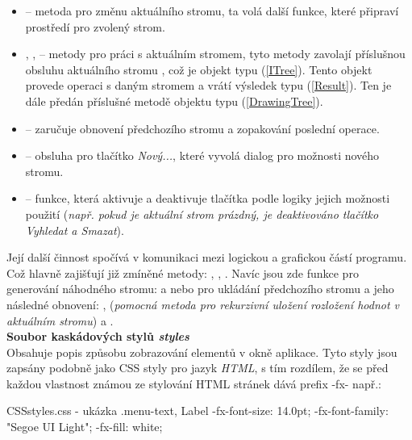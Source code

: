 \documentclass[
  biblatex=false,
  font=serif,
  glossaries=false,
  tables=false,
  theorems=false,
  index
]{kidiplom}
\begin{document}
\begin{itemize}
\item {} -- metoda pro změnu aktuálního stromu, ta volá další funkce, které připraví prostředí pro zvolený strom.

\item {},  ,  \label{zakladniMetody} -- metody pro práci s aktuálním stromem, tyto metody zavolají příslušnou obsluhu aktuálního stromu , což je objekt typu  (\ref{ITree}). Tento objekt provede operaci s daným stromem a vrátí výsledek typu  (\ref{Result}). Ten je dále předán příslušné metodě objektu  typu  (\ref{DrawingTree}).

\item {} -- zaručuje obnovení předchozího stromu a zopakování poslední operace.

\item {} -- obsluha pro tlačítko \textit{Nový...}, které vyvolá dialog pro možnosti nového stromu.

\item {} -- funkce, která aktivuje a deaktivuje tlačítka podle logiky jejich možnosti použití (\textit{např. pokud je aktuální strom prázdný, je deaktivováno tlačítko Vyhledat a Smazat}).
\end{itemize}

\indent Její další činnost spočívá v komunikaci mezi logickou a grafickou částí programu. Což hlavně zajišťují již zmíněné metody: ,  , . Navíc jsou zde funkce pro generování náhodného stromu:  a  nebo pro ukládání předchozího stromu a jeho následné obnovení: ,  (\textit{pomocná metoda pro rekurzivní uložení rozložení hodnot v aktuálním stromu}) a .\\

\noindent \textbf{Soubor kaskádových stylů \textit{styles}}\\
\indent Obsahuje popis způsobu zobrazování elementů v okně aplikace. Tyto styly jsou zapsány podobně jako CSS styly pro jazyk \textit{HTML}, s tím rozdílem, že se před každou vlastnost známou ze stylování HTML stránek dává prefix -fx- např.:
\begin{kicode}{CSS}{}{styles.css - ukázka}
.menu-text, Label  {
    -fx-font-size: 14.0pt;
    -fx-font-family: "Segoe UI Light";
    -fx-fill: white;
}
\end{kicode}
\end{document}
